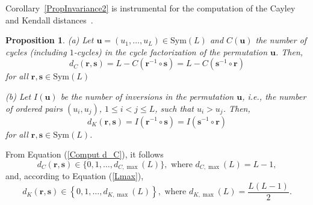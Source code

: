 \documentclass{article}
\newtheorem{proposition}[theorem]{Proposition}
\begin{document}
Corollary~\ref{PropInvariance2} is instrumental for the computation of the
Cayley and Kendall distances~\cite{Nguyen2024}.

\begin{proposition}
\label{PropComput dC dK}(a) Let $\mathbf{u}=(u_{1},\ldots,u_{L})\in \mathrm{Sym}%
(L)$ and $C(\mathbf{u})$ the number of cycles (including $1$-cycles) in the
cycle factorization of the permutation $\mathbf{u}$. Then,%
\begin{equation}
d_{C}(\mathbf{r},\mathbf{s})=L-C(\mathbf{r}^{-1}\circ \mathbf{s})=L-C(%
\mathbf{s}^{-1}\circ \mathbf{r})  \label{Comput d_C}
\end{equation}%
for all $\mathbf{r},\mathbf{s}\in \mathrm{Sym}(L)$

(b) Let $I(\mathbf{u})$ be the number of inversions in the permutation $%
\mathbf{u}$, i.e., the number of ordered pairs $(u_{i},u_{j})$, $1\leq
i<j\leq L$, such that $u_{i}>u_{j}$. Then,%
\begin{equation}
d_{K}(\mathbf{r},\mathbf{s})=I(\mathbf{r}^{-1}\circ \mathbf{s})=I(\mathbf{s}%
^{-1}\circ \mathbf{r})  \label{Comput d_K}
\end{equation}%
for all $\mathbf{r},\mathbf{s}\in \mathrm{Sym}(L)$.
\end{proposition}

From Equation (\ref{Comput d_C}), it follows
\begin{equation}
d_{C}(\mathbf{r},\mathbf{s})\in \{0,1,\ldots,d_{C,\max }(L)\},\text{\ where }%
d_{C,\max }(L)=L-1,  \label{Range d_C}
\end{equation}%
and, according to Equation (\ref{Lmax}), 
\begin{equation}
d_{K}(\mathbf{r},\mathbf{s})\in \left\{ 0,1,\ldots,d_{K,\max }(L)\right\} ,%
\text{\ where }d_{K,\max }(L)=\frac{L(L-1)}{2}.  \label{Range d_K}
\end{equation}
\end{document}
